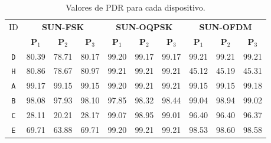 \begin{table}[ht]
    \centering
    \caption{Valores de PDR para cada dispositivo.}
    \begin{tabular}{|c|c|c|c|c|c|c|c|c|c|}
        \hline
        ID                     & \multicolumn{3}{c|}{\textbf{SUN-FSK}} & \multicolumn{3}{c|}{\textbf{SUN-OQPSK}} & \multicolumn{3}{c|}{\textbf{SUN-OFDM}}                                                                                                       \\ \cline{2-10}
                               & \textbf{P$_1$}                        & \textbf{P$_2$}                          & \textbf{P$_3$}                         & \textbf{P$_1$} & \textbf{P$_2$} & \textbf{P$_3$} & \textbf{P$_1$} & \textbf{P$_2$} & \textbf{P$_3$} \\ \hline
        \texttt{D}             & 80.39                                 & 78.71                                   & 80.17                                  & 99.20          & 99.17          & 99.17          & 99.21          & 99.21          & 99.21          \\ \hline
        \texttt{H}             & 80.86                                 & 78.67                                   & 80.97                                  & 99.21          & 99.21          & 99.21          & 45.12          & 45.19          & 45.31          \\ \hline
        \texttt{A}             & 99.17                                 & 99.15                                   & 99.15                                  & 99.20          & 99.21          & 99.21          & 99.15          & 99.15          & 99.18          \\ \hline
        \texttt{B}             & 98.08                                 & 97.93                                   & 98.10                                  & 97.85          & 98.32          & 98.44          & 99.04          & 98.94          & 99.02          \\ \hline
        \texttt{C}             & 28.11                                 & 20.21                                   & 28.17                                  & 99.07          & 98.95          & 99.01          & 96.40          & 96.40          & 96.37          \\ \hline
        \texttt{E}             & 69.71                                 & 63.88                                   & 69.71                                  & 99.20          & 99.21          & 99.21          & 98.53          & 98.60          & 98.58          \\ \hline

\end{tabular}
\end{table}

